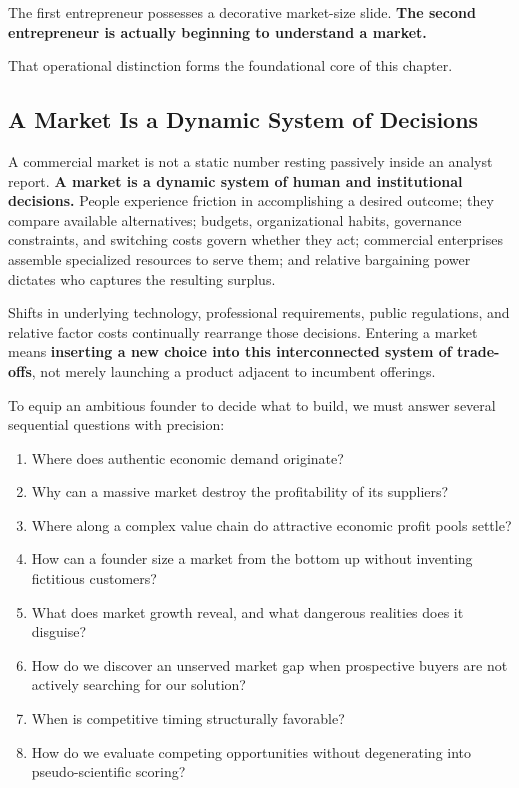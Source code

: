 The first entrepreneur possesses a decorative market-size slide. \textbf{The second entrepreneur is actually beginning to understand a market.}

That operational distinction forms the foundational core of this chapter.

\subsection{A Market Is a Dynamic System of Decisions}

A commercial market is not a static number resting passively inside an analyst report. \textbf{A market is a dynamic system of human and institutional decisions.} People experience friction in accomplishing a desired outcome; they compare available alternatives; budgets, organizational habits, governance constraints, and switching costs govern whether they act; commercial enterprises assemble specialized resources to serve them; and relative bargaining power dictates who captures the resulting surplus.

Shifts in underlying technology, professional requirements, public regulations, and relative factor costs continually rearrange those decisions. Entering a market means \textbf{inserting a new choice into this interconnected system of trade-offs}, not merely launching a product adjacent to incumbent offerings.

To equip an ambitious founder to decide what to build, we must answer several sequential questions with precision:
\begin{enumerate}[leftmargin=12pt,itemsep=2pt,topsep=1pt,parsep=0pt]
  \item Where does authentic economic demand originate?
  \item Why can a massive market destroy the profitability of its suppliers?
  \item Where along a complex value chain do attractive economic profit pools settle?
  \item How can a founder size a market from the bottom up without inventing fictitious customers?
  \item What does market growth reveal, and what dangerous realities does it disguise?
  \item How do we discover an unserved market gap when prospective buyers are not actively searching for our solution?
  \item When is competitive timing structurally favorable?
  \item How do we evaluate competing opportunities without degenerating into pseudo-scientific scoring?
\end{enumerate}

